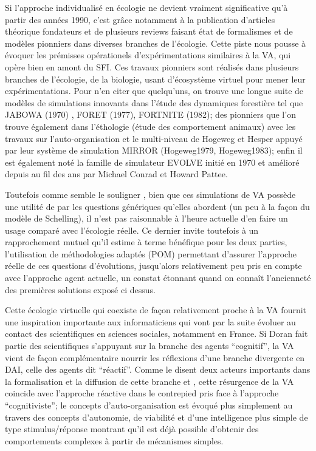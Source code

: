 Si l'approche individualisé en écologie ne devient vraiment significative qu'à partir des années 1990, c'est grâce notamment à la publication d'articles théorique fondateurs \autocite{Huston1988} et de plusieurs reviews faisant état de formalismes \autocite{Hogeweg1988} et de modèles pionniers \autocites{Hogeweg1990, DeAngelis1992, Judson1994} dans diverses branches de l'écologie. Cette piste nous pousse à évoquer les prémisses opérationels d'expérimentations similaires à la VA, qui opère bien en amont du SFI. Ces travaux pionniers sont réalisés dans plusieurs branches de l'écologie, de la biologie, usant d'écosystème virtuel pour mener leur expérimentations. Pour n'en citer que quelqu'uns, on trouve une longue suite de modèles de simulations innovants dans l'étude des dynamiques forestière \autocite{Bugmann2001} tel que JABOWA (1970) \autocite{Botkin1972}, FORET (1977), FORTNITE (1982); des pionniers que l'on trouve également dans l'éthologie (étude des comportement animaux) avec les travaux sur l'auto-organisation et le multi-niveau de Hogeweg et Hesper appuyé par leur système de simulation MIRROR (Hogeweg1979, Hogeweg1983); enfin il est également noté la famille de simulateur EVOLVE initié en 1970 et amélioré depuis au fil des ans par Michael Conrad et Howard Pattee. \autocites{Conrad1970, Pattee2002}


Toutefois comme semble le souligner \textcite{Dorin2008}, bien que ces simulations de VA possède une utilité de par les questions génériques qu'elles abordent (un peu à la façon du modèle de Schelling), il n'est pas raisonnable à l'heure actuelle d'en faire un usage comparé avec l'écologie réelle. Ce dernier invite toutefois à un rapprochement mutuel qu'il estime à terme bénéfique pour les deux parties, l'utilisation de méthodologies adaptés (POM) permettant d'assurer l'approche réelle de ces questions d'évolutions, jusqu'alors relativement peu pris en compte avec l'approche agent actuelle, un constat étonnant quand on connaît l'ancienneté des premières solutions exposé ci dessus.

Cette écologie virtuelle qui coexiste de façon relativement proche à la VA fournit une inspiration importante aux informaticiens qui vont par la suite évoluer au contact des scientifiques en sciences sociales, notamment en France. Si Doran fait partie des scientifiques s'appuyant sur la branche des agents \enquote{cognitif}, la VA vient de façon complémentaire nourrir les réflexions d'une branche divergente en DAI, celle des agents dit \enquote{réactif}. Comme le disent deux acteurs importants dans la formalisation et la diffusion de cette branche \autocite[31-32]{Ferber1995} et \textcite[7-10]{Drogoul1993}, cette résurgence de la VA coincide avec l'approche réactive dans le contrepied pris face à l'approche \enquote{cognitiviste}; le concepts d'auto-organisation est évoqué plus simplement au travers des concepts d'autonomie, de viabilité et d'une intelligence plus simple de type stimulus/réponse montrant qu'il est déjà possible d'obtenir des comportements complexes à partir de mécanismes simples.



